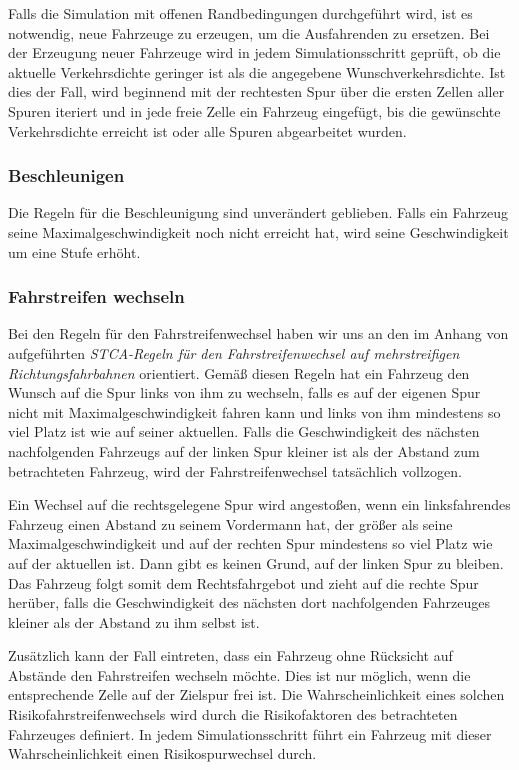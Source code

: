 \documentclass[10pt, a4paper]{article}
\newcommand\q[1]{\glqq{}#1\grqq{}}
\begin{document}
Falls die Simulation mit offenen Randbedingungen durchgeführt wird, ist es notwendig, neue Fahrzeuge zu erzeugen, um die Ausfahrenden zu ersetzen. Bei der Erzeugung neuer Fahrzeuge wird in jedem Simulationsschritt geprüft, ob die aktuelle Verkehrsdichte geringer ist als die angegebene Wunschverkehrsdichte. Ist dies der Fall, wird beginnend mit der rechtesten Spur über die ersten Zellen aller Spuren iteriert und in jede freie Zelle ein Fahrzeug eingefügt, bis die gewünschte Verkehrsdichte erreicht ist oder alle Spuren abgearbeitet wurden. 

\subsubsection{Beschleunigen}
\label{subsubsec:beschleunigen}

Die Regeln für die Beschleunigung sind unverändert geblieben. Falls ein Fahrzeug seine Maximalgeschwindigkeit noch nicht erreicht hat, wird seine Geschwindigkeit um eine Stufe erhöht.

\subsubsection{Fahrstreifen wechseln}
\label{subsubsec:fahrstreifenWechseln}

Bei den Regeln für den Fahrstreifenwechsel haben wir uns an den im Anhang von \cite{mehrspurig} aufgeführten \emph{\q{STCA-Regeln für den Fahrstreifenwechsel auf mehrstreifigen Richtungsfahrbahnen}} orientiert. Gemäß diesen Regeln hat ein Fahrzeug den Wunsch auf die Spur links von ihm zu wechseln, falls es auf der eigenen Spur nicht mit Maximalgeschwindigkeit fahren kann und links von ihm mindestens so viel Platz ist wie auf seiner aktuellen. Falls die Geschwindigkeit des nächsten nachfolgenden Fahrzeugs auf der linken Spur kleiner ist als der Abstand zum betrachteten Fahrzeug, wird der Fahrstreifenwechsel tatsächlich vollzogen.

Ein Wechsel auf die rechtsgelegene Spur wird angestoßen, wenn ein linksfahrendes Fahrzeug einen Abstand zu seinem Vordermann hat, der größer als seine Maximalgeschwindigkeit und auf der rechten Spur mindestens so viel Platz wie auf der aktuellen ist. Dann gibt es keinen Grund, auf der linken Spur zu bleiben. Das Fahrzeug folgt somit dem Rechtsfahrgebot und zieht auf die rechte Spur herüber, falls die Geschwindigkeit des nächsten dort nachfolgenden Fahrzeuges kleiner als der Abstand zu ihm selbst ist.

Zusätzlich kann der Fall eintreten, dass ein Fahrzeug ohne Rücksicht auf Abstände den Fahrstreifen wechseln möchte. Dies ist nur möglich, wenn die entsprechende Zelle auf der Zielspur frei ist. Die Wahrscheinlichkeit eines solchen Risikofahrstreifenwechsels wird durch die Risikofaktoren des betrachteten Fahrzeuges definiert. In jedem Simulationsschritt führt ein Fahrzeug mit dieser Wahrscheinlichkeit einen Risikospurwechsel durch.
\end{document}
